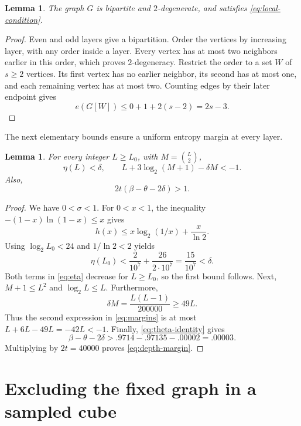 \documentclass[11pt,leqno]{amsart}
\numberwithin{equation}{section}
\newtheorem{lemma}[theorem]{Lemma}
\theoremstyle{definition}
\theoremstyle{remark}
\begin{document}
\begin{lemma}\label{lem:local-sparsity}
The graph $G$ is bipartite and $2$-degenerate, and satisfies \eqref{eq:local-condition}.
\end{lemma}

\begin{proof}
Even and odd layers give a bipartition. Order the vertices by increasing layer, with any order inside a layer. Every vertex has at most two neighbors earlier in this order, which proves $2$-degeneracy. Restrict the order to a set $W$ of $s\ge2$ vertices. Its first vertex has no earlier neighbor, its second has at most one, and each remaining vertex has at most two. Counting edges by their later endpoint gives
\[
 e(G[W])\le0+1+2(s-2)=2s-3.
\]
\end{proof}

The next elementary bounds ensure a uniform entropy margin at every layer.

\begin{lemma}\label{lem:fixed-margins}
For every integer $L\ge L_0$, with $M=\binom L2$,
\begin{equation}\label{eq:margins}
 \eta(L)<\delta,\qquad
 L+3\log_2(M+1)-\delta M<-1.
\end{equation}
Also,
\begin{equation}\label{eq:depth-margin}
 2t(\beta-\theta-2\delta)>1.
\end{equation}
\end{lemma}

\begin{proof}
We have $0<\sigma<1$. For $0<x<1$, the inequality $-(1-x)\ln(1-x)\le x$ gives
\[
 h(x)\le x\log_2(1/x)+\frac{x}{\ln2}.
\]
Using $\log_2 L_0<24$ and $1/\ln2<2$ yields
\[
 \eta(L_0)<\frac2{10^7}+\frac{26}{2\cdot10^7}
 =\frac{15}{10^7}<\delta.
\]
Both terms in \eqref{eq:eta} decrease for $L\ge L_0$, so the first bound follows. Next, $M+1\le L^2$ and $\log_2L\le L$. Furthermore,
\[
 \delta M=\frac{L(L-1)}{200000}\ge49L.
\]
Thus the second expression in \eqref{eq:margins} is at most $L+6L-49L=-42L<-1$. Finally, \eqref{eq:theta-identity} gives
\[
 \beta-\theta-2\delta>.9714-.97135-.00002=.00003.
\]
Multiplying by $2t=40000$ proves \eqref{eq:depth-margin}.
\end{proof}

\section{Excluding the fixed graph in a sampled cube}
\end{document}

